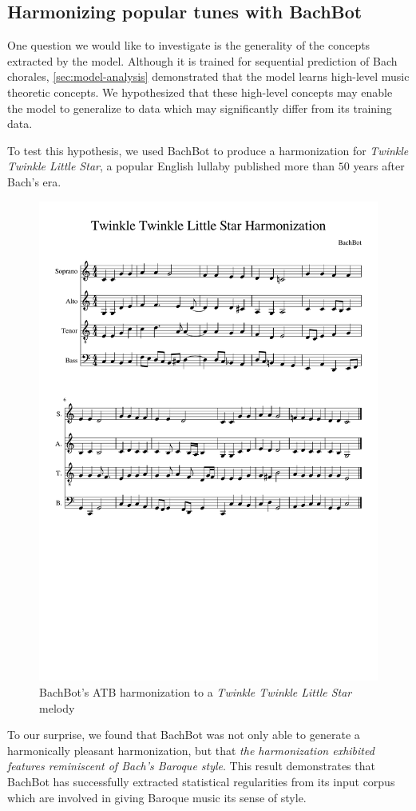 \subsection{Harmonizing popular tunes with BachBot}

One question we would like to investigate is the generality of the concepts
extracted by the model. Although it is trained for sequential prediction of
Bach chorales, \cref{sec:model-analysis} demonstrated that the model learns
high-level music theoretic concepts. We hypothesized that these high-level
concepts may enable the model to generalize to data which may significantly
differ from its training data.

To test this hypothesis, we used BachBot to produce a harmonization for
\textit{Twinkle Twinkle Little Star}, a popular English lullaby published
more than $50$ years after Bach's era.

\begin{figure}[tb]
  \centering
  \includegraphics[trim={0 10cm 0 3.7cm},clip,width=0.9\linewidth]{twinkle-twinkle-score.pdf}
  \caption{BachBot's ATB harmonization to a \textit{Twinkle Twinkle Little Star} melody}
  \label{fig:harm-twinkle-twinkle}
\end{figure}

To our surprise, we found that BachBot was not only able to generate a
harmonically pleasant harmonization, but that \emph{the harmonization exhibited
features reminiscent of Bach's Baroque style}. This result demonstrates that
BachBot has successfully extracted statistical regularities from its input
corpus which are involved in giving Baroque music its sense of style.
